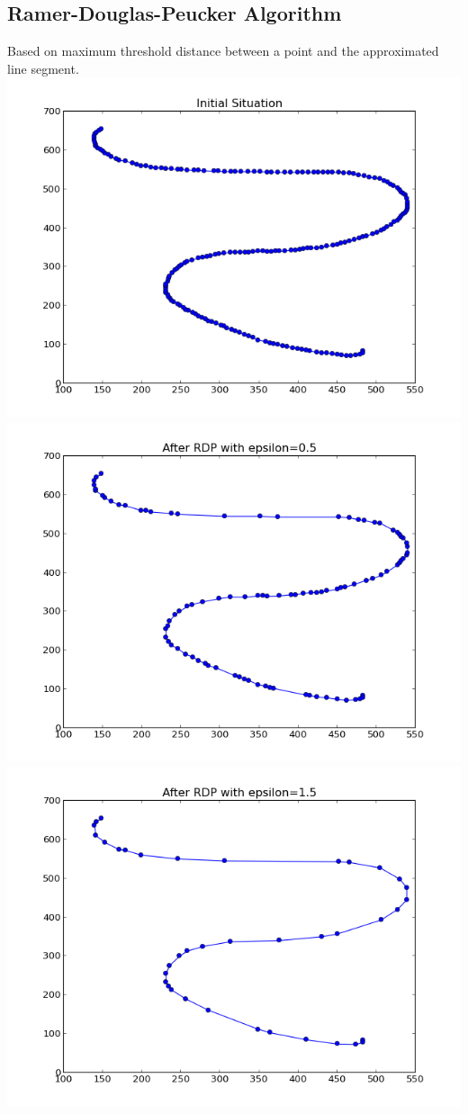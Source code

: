 \documentclass[twoside]{scrartcl}
\begin{document}
\subsection{Ramer-Douglas-Peucker Algorithm}
Based on maximum threshold distance between a point and the approximated
line segment.\\
\includegraphics[scale=0.48]{simp-4.png}
\includegraphics[scale=0.48]{simp-5.png}
\includegraphics[scale=0.48]{simp-6.png}\\
\end{document}
